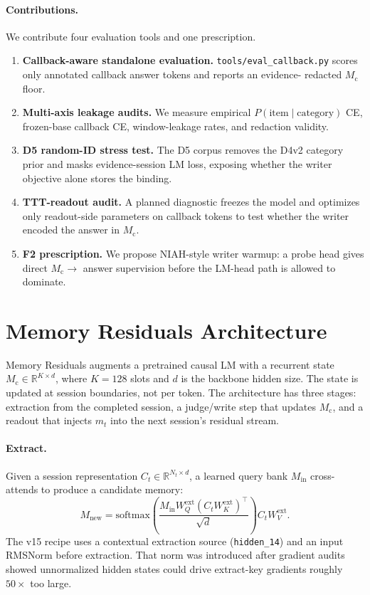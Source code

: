\documentclass{article}
\newcommand{\Mc}{M_{\mathrm{c}}}
\newcommand{\Ct}{C_t}
\newcommand{\mt}{m_t}
\newcommand{\Min}{M_{\mathrm{in}}}
\newcommand{\Mnew}{M_{\mathrm{new}}}
\begin{document}
\paragraph{Contributions.}
We contribute four evaluation tools and one prescription.
\begin{enumerate}
\item \textbf{Callback-aware standalone evaluation.}  \texttt{tools/eval\_callback.py}
scores only annotated callback answer tokens and reports an evidence-
redacted $\Mc$ floor.
\item \textbf{Multi-axis leakage audits.}  We measure empirical
$P(\mathrm{item}\mid\mathrm{category})$ CE, frozen-base callback CE,
window-leakage rates, and redaction validity.
\item \textbf{D5 random-ID stress test.}  The D5 corpus removes the D4v2
category prior and masks evidence-session LM loss, exposing whether the
writer objective alone stores the binding.
\item \textbf{TTT-readout audit.}  A planned diagnostic freezes the
model and optimizes only readout-side parameters on callback tokens to
test whether the writer encoded the answer in $\Mc$.
\item \textbf{F2 prescription.}  We propose NIAH-style writer warmup:
a probe head gives direct $\Mc\!\rightarrow$ answer supervision before
the LM-head path is allowed to dominate.
\end{enumerate}

\section{Memory Residuals Architecture}

Memory Residuals augments a pretrained causal LM with a recurrent state
$\Mc \in \mathbb{R}^{K \times d}$, where $K=128$ slots and $d$ is the
backbone hidden size.  The state is updated at session boundaries, not
per token.  The architecture has three stages: extraction from the
completed session, a judge/write step that updates $\Mc$, and a readout
that injects $\mt$ into the next session's residual stream.

\paragraph{Extract.}
Given a session representation $\Ct \in \mathbb{R}^{N_t \times d}$,
a learned query bank $\Min$ cross-attends to produce a candidate memory:
\begin{equation}
\Mnew =
\mathrm{softmax}\!\left(
  \frac{\Min W_Q^{\mathrm{ext}}(\Ct W_K^{\mathrm{ext}})^\top}{\sqrt d}
\right)\Ct W_V^{\mathrm{ext}} .
\end{equation}
The v15 recipe uses a contextual extraction source
(\texttt{hidden\_14}) and an input RMSNorm before extraction.  That norm
was introduced after gradient audits showed unnormalized hidden states
could drive extract-key gradients roughly $50\times$ too large.
\end{document}
